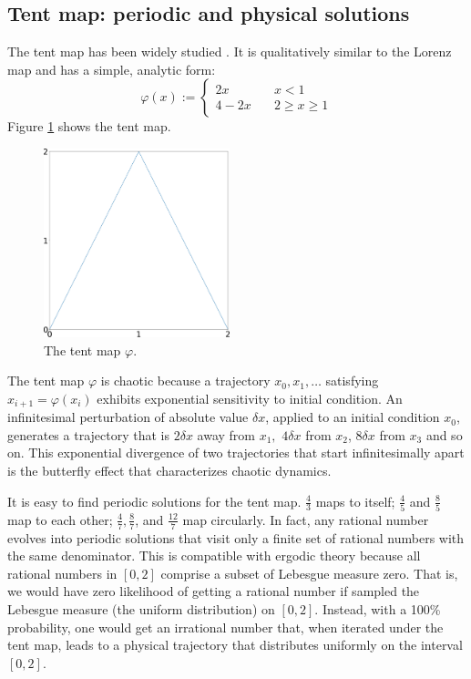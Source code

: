 \subsection{Tent map: periodic and physical solutions}
\label{sec:tent}
The tent map has been widely studied \cite{tent1}\cite{tent2}.  It is qualitatively similar
to the Lorenz map and has a simple, analytic form:
\begin{equation} \label{tentmap}
    \varphi(x) := \begin{cases}
    2x \quad & x < 1 \\
    4 - 2x \quad & 2 \ge x \ge 1
    \end{cases}
\end{equation}
Figure \ref{fig:tent_map} shows the tent map.
\begin{figure}[H]\centering
\includegraphics[width=0.48\textwidth]{figure/tent_map.png}
\caption{The tent map $\varphi$.}
\label{fig:tent_map}
\end{figure}

The tent map $\varphi$ is chaotic because a trajectory $x_0,x_1,\ldots$ satisfying
$x_{i+1} = \varphi(x_i)$ exhibits exponential sensitivity to initial condition. An infinitesimal perturbation of absolute value $\delta x$, applied to an initial condition $x_0$, generates a trajectory that is $2 \delta x$ away from $x_1,$ $4 \delta x$ from $x_2$, $8 \delta x$ from $x_3$ and so on. This exponential divergence of two trajectories that start infinitesimally apart is the butterfly effect that characterizes
chaotic dynamics.

It is easy to find periodic solutions for the tent map.
$\frac43$ maps to itself; $\frac45$ and $\frac85$ map to each other;
$\frac47, \frac87$, and $\frac{12}7$ map circularly.  In fact, any rational number evolves into periodic solutions that visit
only a finite set of rational numbers with the same denominator.
This is compatible
with ergodic theory because all rational numbers in $[0,2]$ comprise a subset of Lebesgue measure zero. That is, we would have zero likelihood of getting a
rational number if sampled the Lebesgue measure (the uniform distribution) on $[0,2]$.  Instead, with a 100\% probability, one would get an irrational number
that, when iterated under the tent map, leads to a physical trajectory that distributes uniformly on the interval $[0,2]$.

